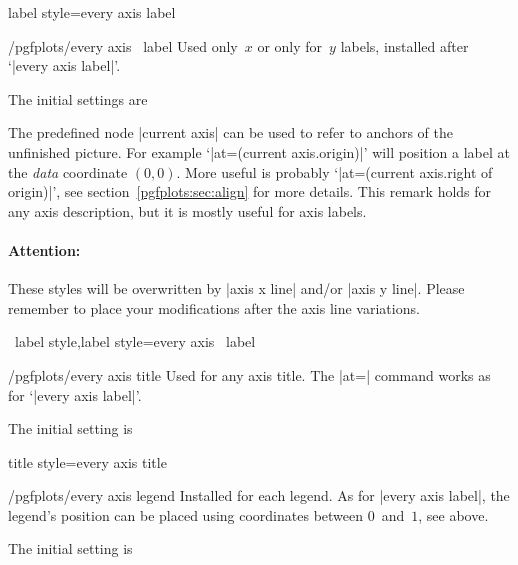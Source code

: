 \pgfplotsshortstylekey label style=every axis label\pgfeov

\begin{xystylekey}{/pgfplots/every axis \x\ label}
 Used only~$x$ or only for~$y$ labels, installed after `|every axis label|'.

 The initial settings are
\begin{codeexample}
\end{codeexample}

 The predefined node |current axis| can be used to refer to anchors of the unfinished picture. For example
 `|at={(current axis.origin)}|' will position a label at the \emph{data} coordinate $(0,0)$. More useful is probably
 `|at={(current axis.right of origin)}|', see
 section~\ref{pgfplots:sec:align} for more details. This remark holds
 for any axis description, but it is mostly useful for axis labels.

\paragraph{Attention:} These styles will be overwritten by |axis x line| and/or |axis y line|. Please remember to place your modifications after the axis line variations.
\end{xystylekey}

\pgfplotsshortxystylekeys \x\ label style,\x label style=every axis \x\ label\pgfeov

\begin{stylekey}{/pgfplots/every axis title}
 Used for any axis title. The |at=| command works as for `|every axis label|'.

The initial setting is
\begin{codeexample}
\end{codeexample}
\end{stylekey}

\pgfplotsshortstylekey title style=every axis title\pgfeov

\begin{stylekey}{/pgfplots/every axis legend}
 Installed for each legend. As for |every axis label|, the legend's position can be placed using coordinates between $0$~and~$1$, see above.

 The initial setting is
\begin{codeexample}
\end{codeexample}
\end{stylekey}

